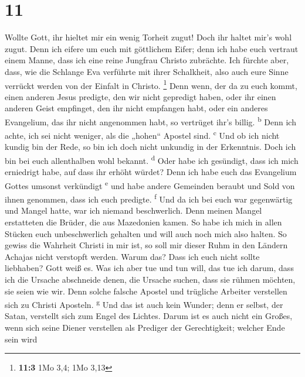 \hypertarget{section-10}{%
\section{11}\label{section-10}}

 Wollte Gott, ihr hieltet mir ein wenig Torheit zugut!
Doch ihr haltet mir's wohl zugut.  Denn ich eifere um euch
mit göttlichem Eifer; denn ich habe euch vertraut einem Manne, dass ich
eine reine Jungfrau Christo zubrächte.  Ich fürchte aber,
dass, wie die Schlange Eva verführte mit ihrer Schalkheit, also auch
eure Sinne verrückt werden von der Einfalt in Christo. \footnote{\textbf{11:3}
  1Mo 3,4; 1Mo 3,13}  Denn wenn, der da zu euch kommt,
einen anderen Jesus predigte, den wir nicht gepredigt haben, oder ihr
einen anderen Geist empfinget, den ihr nicht empfangen habt, oder ein
anderes Evangelium, das ihr nicht angenommen habt, so vertrüget ihr's
billig. \textsuperscript{b}  Denn ich achte, ich sei nicht
weniger, als die „hohen`` Apostel sind. \textsuperscript{c}
 Und ob ich nicht kundig bin der Rede, so bin ich doch
nicht unkundig in der Erkenntnis. Doch ich bin bei euch allenthalben
wohl bekannt. \textsuperscript{d}  Oder habe ich
gesündigt, dass ich mich erniedrigt habe, auf dass ihr erhöht würdet?
Denn ich habe euch das Evangelium Gottes umsonst verkündigt
\textsuperscript{e}  und habe andere Gemeinden beraubt und
Sold von ihnen genommen, dass ich euch predigte. \textsuperscript{f}
 Und da ich bei euch war gegenwärtig und Mangel hatte, war
ich niemand beschwerlich. Denn meinen Mangel erstatteten die Brüder, die
aus Mazedonien kamen. So habe ich mich in allen Stücken euch
unbeschwerlich gehalten und will auch noch mich also halten.
 So gewiss die Wahrheit Christi in mir ist, so soll mir
dieser Ruhm in den Ländern Achajas nicht verstopft werden.
 Warum das? Dass ich euch nicht sollte liebhaben? Gott
weiß es.  Was ich aber tue und tun will, das tue ich
darum, dass ich die Ursache abschneide denen, die Ursache suchen, dass
sie rühmen möchten, sie seien wie wir.  Denn solche
falsche Apostel und trügliche Arbeiter verstellen sich zu Christi
Aposteln. \textsuperscript{g}  Und das ist auch kein
Wunder; denn er selbst, der Satan, verstellt sich zum Engel des Lichtes.
 Darum ist es auch nicht ein Großes, wenn sich seine
Diener verstellen als Prediger der Gerechtigkeit; welcher Ende sein wird
